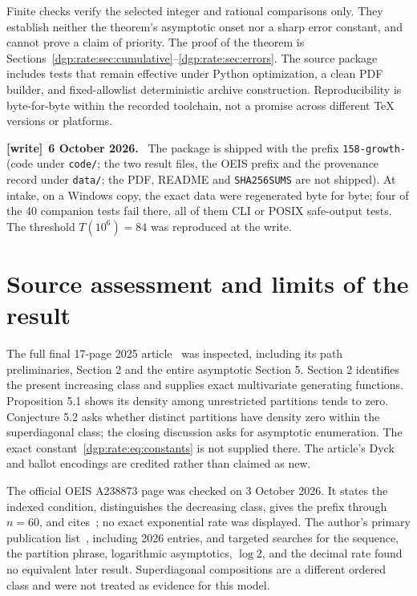 \documentclass[11pt,letterpaper]{article}
\numberwithin{equation}{section}
\theoremstyle{remark}\newtheorem{remark}[theorem]{Remark}
\newcommand{\file}[1]{\nolinkurl{#1}}
\newenvironment{writenote}[1][]{\par\smallskip\begingroup\small
 \noindent\textbf{[write]}\if\relax\detokenize{#1}\relax\else~\textbf{#1.}\fi\ }%
 {\par\endgroup\smallskip}
\begin{document}
Finite checks verify the selected integer and rational comparisons only.
They establish neither the theorem's asymptotic onset nor a sharp error
constant, and cannot prove a claim of priority. The proof of the theorem
is Sections~\ref{dgp:rate:sec:cumulative}--\ref{dgp:rate:sec:errors}. The source package
includes tests that remain effective under Python optimization, a clean
PDF builder, and fixed-allowlist deterministic archive construction.
Reproducibility is byte-for-byte within the recorded toolchain, not a
promise across different TeX versions or platforms.
\begin{writenote}[6 October 2026]
The package is shipped with the prefix \file{158-growth-} (code under \file{code/}; the two result files, the OEIS prefix and the provenance record under \file{data/}; the PDF, README and \file{SHA256SUMS} are not shipped). At intake, on a Windows copy, the exact data were regenerated byte for byte; four of the 40 companion tests fail there, all of them CLI or POSIX safe-output tests. The threshold $T(10^6)=84$ was reproduced at the write.
\end{writenote}

\section{Source assessment and limits of the result}\label{dgp:rate:sec:sources}
The full final 17-page 2025 article~\cite{abek} was inspected, including
its path preliminaries, Section 2 and the entire asymptotic Section 5.
Section 2 identifies the present increasing class and supplies exact
multivariate generating functions. Proposition 5.1 shows its density
among unrestricted partitions tends to zero. Conjecture 5.2 asks whether
distinct partitions have density zero within the superdiagonal class;
the closing discussion asks for asymptotic enumeration. The exact
constant~\eqref{dgp:rate:eq:constants} is not supplied there. The article's Dyck
and ballot encodings are credited rather than claimed as new.

The official OEIS A238873 page was checked on 3 October 2026. It states
the indexed condition, distinguishes the decreasing class, gives the
prefix through $n=60$, and cites~\cite{abek}; no exact exponential rate
was displayed. The author's primary publication list~\cite{elizalde},
including 2026 entries, and targeted searches for the sequence, the
partition phrase, logarithmic asymptotics, $\log2$, and the decimal rate
found no equivalent later result. Superdiagonal compositions are a
different ordered class and were not treated as evidence for this model.
\end{document}
